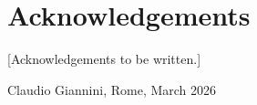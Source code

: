 \thispagestyle{plain}
\section*{Acknowledgements}

[Acknowledgements to be written.]

\vspace{1.5cm}
\hfill
Claudio Giannini, Rome, March 2026

\newpage
\thispagestyle{empty}
\mbox{}
